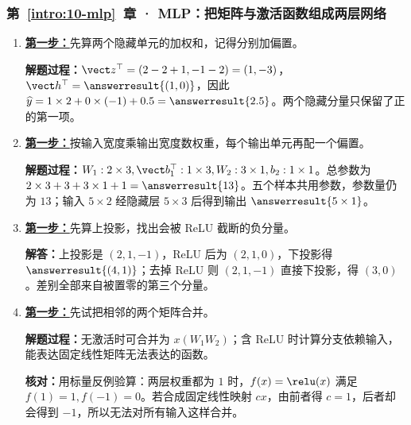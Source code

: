 \subsubsection*{第~\ref*{intro:10-mlp}~章 · MLP：把矩阵与激活函数组成两层网络}
\begin{enumerate}[label={},leftmargin=4.8em,itemsep=4pt]
\item[\textbf{C-033.}] \leavevmode{}\label{solution:C-033}\label{solution:mlp-activation-forward}\hyperref[exercise:mlp-activation-forward]{\textbf{第一步：}}先算两个隐藏单元的加权和，记得分别加偏置。\par\nobreak
\textbf{解题过程：}$\vect z^\top=(2-2+1,-1-2)=(1,-3)$，$\vect h^\top=\answerresult{(1,0)}$，因此 $\widehat{y}=1\times2+0\times(-1)+0.5=\answerresult{2.5}$。两个隐藏分量只保留了正的第一项。
\item[\textbf{C-034.}] \leavevmode{}\label{solution:C-034}\label{solution:mlp-parameter-count}\hyperref[exercise:mlp-parameter-count]{\textbf{第一步：}}按输入宽度乘输出宽度数权重，每个输出单元再配一个偏置。\par\nobreak
\textbf{解题过程：}$W_1:2\times3,\vect b_1^\top:1\times3,W_2:3\times1,b_2:1\times1$。总参数为 $2\times3+3+3\times1+1=\answerresult{13}$。五个样本共用参数，参数量仍为 $13$；输入 $5\times2$ 经隐藏层 $5\times3$ 后得到输出 $\answerresult{5\times1}$。
\item[\textbf{C-035.}] \leavevmode{}\label{solution:C-035}\label{solution:mlp-negative-activation}\hyperref[exercise:mlp-negative-activation]{\textbf{第一步：}}先算上投影，找出会被 ReLU 截断的负分量。\par\nobreak
\textbf{解答：}上投影是 $(2,1,-1)$，ReLU 后为 $(2,1,0)$，下投影得 $\answerresult{(4,1)}$；去掉 ReLU 则 $(2,1,-1)$ 直接下投影，得 $(3,0)$。差别全部来自被置零的第三个分量。
\item[\textbf{C-036.}] \leavevmode{}\label{solution:C-036}\label{solution:mlp-linear-composition}\hyperref[exercise:mlp-linear-composition]{\textbf{第一步：}}先试把相邻的两个矩阵合并。\par\nobreak\textbf{解题过程：}无激活时可合并为 $x(W_1W_2)$；含 ReLU 时计算分支依赖输入，能表达固定线性矩阵无法表达的函数。\par\textbf{核对：}用标量反例验算：两层权重都为 $1$ 时，$f(x)=\relu(x)$ 满足 $f(1)=1,f(-1)=0$。若合成固定线性映射 $cx$，由前者得 $c=1$，后者却会得到 $-1$，所以无法对所有输入这样合并。
\end{enumerate}
